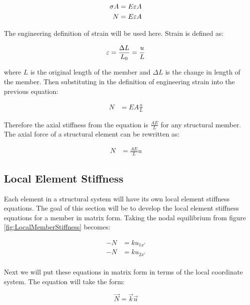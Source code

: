 \begin{align}
	\sigma A &= E \varepsilon A\\
	N & = E \varepsilon A
\end{align}

The engineering definition of strain will be used here. Strain is defined as:

\begin{equation}
	\varepsilon = \frac{\Delta L}{L_0} = \frac{u}{L}
\end{equation}

where $L$ is the original length of the member and $\Delta L$ is the change in length of the member. Then substituting in the definition of engineering strain into the previous equation:

\begin{align}
	N & = EA \frac{u}{L}
\end{align}

Therefore the axial stiffness from the equation is $\frac{AE}{L}$ for any structural member. The axial force of a structural element can be rewritten as:

\begin{align}
	N & = \frac{AE}{L} u
\end{align}

\subsection{Local Element Stiffness}
Each element in a structural system will have its own local element stiffness equations. The goal of this section will be to develop the local element stiffness equations for a member in matrix form. Taking the nodal equilibrium from figure \ref{fig:LocalMemberStiffness} becomes:

\begin{align*}
	-N &= ku_{1x'}\\
	-N &= ku_{2x'}\\
\end{align*}

Next we will put these equations in matrix form in terms of the local coordinate system. The equation will take the form:

\begin{equation}
	\vec{N} = \vec{k} \vec{u}
\end{equation}

